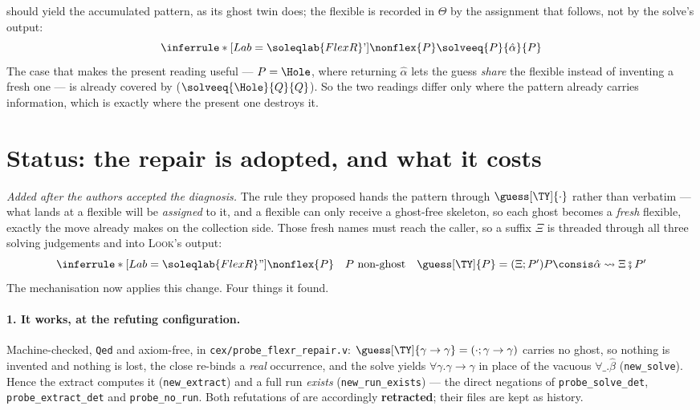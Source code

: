 \documentclass[11pt,a4paper]{article}
\theoremstyle{definition}
\newcommand{\coq}[1]{\texttt{\small #1}}
\newcommand{\nonghost}[1]{#1\text{ non-ghost}}
\newcommand{\Qed}{\coq{Qed}}
\begin{document}
 should yield the accumulated pattern, as its ghost twin
does; the flexible is recorded in $\Theta$ by the assignment that follows,
not by the solve's output:
\[
\inferrule*[Lab=\soleqlab{FlexR}$'$]
{\nonflex{P}}
{\solveeq{P}{\hat\alpha}{P}}
\]
The case that makes the present reading useful --- $P = \Hole$, where
returning $\hat\alpha$ lets the guess \emph{share} the flexible instead of
inventing a fresh one --- is already covered by 
($\solveeq{\Hole}{Q}{Q}$).  So the two readings differ only where the
pattern already carries information, which is exactly where the present
one destroys it.

\section{Status: the repair is adopted, and what it costs}\label{sec:status}

\emph{Added after the authors accepted the diagnosis.}  The rule they
proposed hands the pattern through $\guess[\TY]{\cdot}$ rather than
verbatim --- what lands at a flexible will be \emph{assigned} to it, and a
flexible can only receive a ghost-free skeleton, so each ghost becomes a
\emph{fresh} flexible, exactly the move  already makes on the
collection side.  Those fresh names must reach the caller, so a suffix
$\Xi$ is threaded through all three solving judgements and into
\textsc{Look}'s output:
\[
\inferrule*[Lab=\soleqlab{FlexR}$''$]
{\nonflex{P} \quad \nonghost{P} \quad \guess[\TY]{P} = (\Xi; P')}
{\solveeqx{P}{\hat\alpha}{\Xi}{P'}}
\]
The mechanisation now applies this change.  Four things it found.

\paragraph{1. It works, at the refuting configuration.}
Machine-checked, \Qed{} and axiom-free, in \coq{cex/probe\_flexr\_repair.v}:
$\guess[\TY]{\gamma\to\gamma} = (\cdot;\gamma\to\gamma)$ carries no ghost,
so nothing is invented and nothing is lost, the close re-binds a
\emph{real} occurrence, and the solve yields $\forall\gamma.\gamma\to\gamma$
in place of the vacuous $\forall\_.\hat\beta$
(\coq{new\_solve}).  Hence the extract computes it (\coq{new\_extract}) and
a full run \emph{exists} (\coq{new\_run\_exists}) --- the direct negations
of \coq{probe\_solve\_det}, \coq{probe\_extract\_det} and
\coq{probe\_no\_run}.  Both refutations of  are
accordingly \textbf{retracted}; their files are kept as history.
\end{document}
